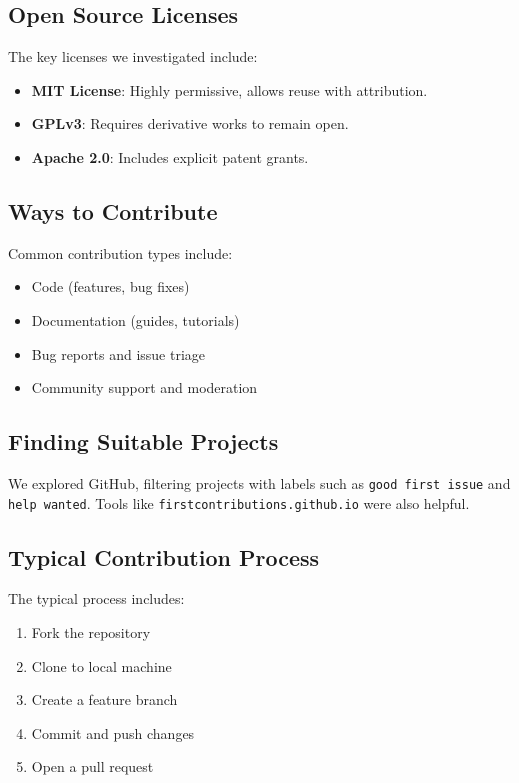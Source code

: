 \documentclass[12pt]{article}
\begin{document}
\subsection{Open Source Licenses}
The key licenses we investigated include:

\begin{itemize}
    \item \textbf{MIT License}: Highly permissive, allows reuse with attribution.
    \item \textbf{GPLv3}: Requires derivative works to remain open.
    \item \textbf{Apache 2.0}: Includes explicit patent grants.
\end{itemize}

\subsection{Ways to Contribute}
Common contribution types include:
\begin{itemize}
    \item Code (features, bug fixes)
    \item Documentation (guides, tutorials)
    \item Bug reports and issue triage
    \item Community support and moderation
\end{itemize}

\subsection{Finding Suitable Projects}
We explored GitHub, filtering projects with labels such as \texttt{good first issue} and \texttt{help wanted}. Tools like \texttt{firstcontributions.github.io} were also helpful.

\subsection{Typical Contribution Process}
The typical process includes:
\begin{enumerate}
    \item Fork the repository
    \item Clone to local machine
    \item Create a feature branch
    \item Commit and push changes
    \item Open a pull request
\end{enumerate}
\end{document}
